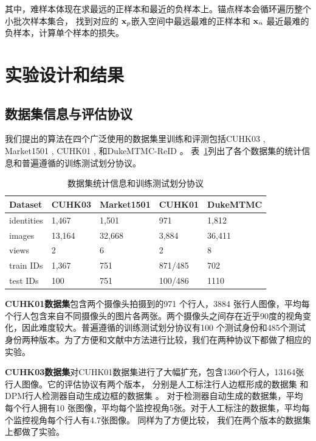 其中，难样本体现在求最远的正样本和最近的负样本上。锚点样本会循环遍历整个小批次样本集合，
找到对应的 ${\mathbf{x}}_p$嵌入空间中最远最难的正样本和 ${\mathbf{x}}_n$ 最近最难的负样本，计算单个样本的损失。

\section{实验设计和结果}

\subsection{数据集信息与评估协议}

我们提出的算法在四个广泛使用的数据集里训练和评测包括CUHK03 \cite{li2014deepreid}, 
Market1501 \cite{zheng2015scalable},  CUHK01 \cite{li2013locally}, 
和DukeMTMC-ReID \cite{zheng2017unlabeled} \cite{ristani2016MTMC} 。
表~\ref{table:dataset}列出了各个数据集的统计信息和普遍遵循的训练测试划分协议。

\begin{table}
	\centering
	\caption{数据集统计信息和训练测试划分协议}
	\label{table:dataset}
	\begin{tabular}{lllll}
		\toprule
		Dataset    & CUHK03 & Market1501 & CUHK01  & DukeMTMC \\
		\midrule
		identities & 1,467  & 1,501      & 971     & 1,812     \\
		images     & 13,164 & 32,668     & 3,884   & 36,411    \\
		views      & 2      & 6          & 2       & 8           \\
		train IDs  & 1,367  & 751        & 871/485 & 702        \\
		test IDs   & 100    & 751        & 100/486 & 1110        \\
		\bottomrule
	\end{tabular}
\end{table}

\textbf{CUHK01数据集}包含两个摄像头拍摄到的971 个行人，3884 张行人图像，平均每个行人包含来自不同摄像头的图片各两张。两个摄像头之间存在近乎90度的视角变化，因此难度较大。普遍遵循的训练测试划分协议有100 个测试身份和485个测试身份两种版本。为了方便和文献中方法进行比较，我们在两种协议下都做了相应的实验。

\textbf{CUHK03数据集}对CUHK01数据集进行了大幅扩充，包含1360个行人，13164张行人图像。它的评估协议有两个版本，
分别是人工标注行人边框形成的数据集
和DPM行人检测器自动生成边框的数据集
。
对于检测器自动生成的数据集，平均每个行人拥有10 张图像，平均每个监控视角5张。对于人工标注的数据集，平均每个监控视角每个行人有4.7张图像。
同样为了方便比较，
我们在两个版本的数据集上都做了实验。

